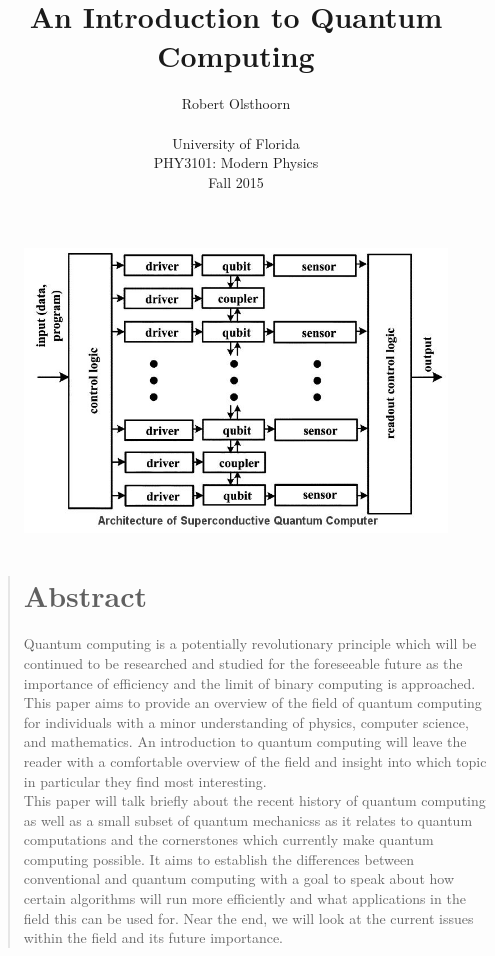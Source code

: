 \documentclass[12pt]{article}
\title{An Introduction to Quantum Computing}
\author
{Robert Olsthoorn\\
\\
\normalsize{University of Florida}\\
\normalsize{PHY3101: Modern Physics}\\
\normalsize{Fall 2015}\\
}
\date{}
\newenvironment{sciabstract}{%
\begin{quote} \bf}
{\end{quote}}
\begin{document}
 




\baselineskip24pt


\begin{figure}
\includegraphics[scale=.5]{superconductive}
\centering
\end{figure}

\maketitle 


\newpage

\begin{sciabstract}
\section*{Abstract}
Quantum computing is a potentially revolutionary principle which will be continued to be researched and studied for the foreseeable future as the importance of efficiency and the limit of binary computing is approached. This paper aims to provide an overview of the field of quantum computing for individuals with a minor understanding of physics, computer science, and mathematics. An introduction to quantum computing will leave the reader with a comfortable overview of the field and insight into which topic in particular they find most interesting.\\
This paper will talk briefly about the recent history of quantum computing as well as a small subset of quantum mechanicss as it relates to quantum computations and the cornerstones which currently make quantum computing possible. It aims to establish the differences between conventional and quantum computing with a goal to speak about how certain algorithms will run more efficiently and what applications in the field this can be used for. Near the end, we will look at the current issues within the field and its future importance.

\end{sciabstract}
\end{document}
